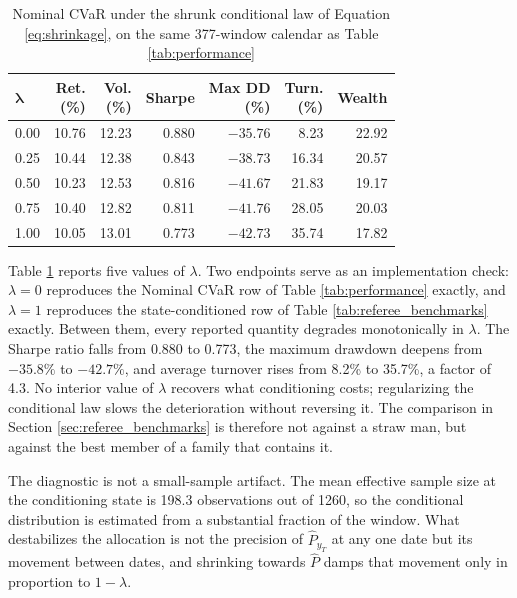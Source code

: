 \documentclass[smallcondensed]{svjour3}
\begin{document}
\begin{table}[!htbp]
\centering
\caption{Nominal CVaR under the shrunk conditional law of Equation \eqref{eq:shrinkage}, on the same 377-window calendar as Table \ref{tab:performance}}
\label{tab:shrinkage}
\small
\begin{tabular}{lrrrrrr}
\toprule
$\boldsymbol{\lambda}$ & \makecell[r]{\textbf{Ret.}\\\textbf{(\%)}} & \makecell[r]{\textbf{Vol.}\\\textbf{(\%)}} & \textbf{Sharpe} & \makecell[r]{\textbf{Max DD}\\\textbf{(\%)}} & \makecell[r]{\textbf{Turn.}\\\textbf{(\%)}} & \textbf{Wealth} \\
\midrule
0.00 & 10.76 & 12.23 & 0.880 & $-35.76$ & 8.23 & 22.92 \\
0.25 & 10.44 & 12.38 & 0.843 & $-38.73$ & 16.34 & 20.57 \\
0.50 & 10.23 & 12.53 & 0.816 & $-41.67$ & 21.83 & 19.17 \\
0.75 & 10.40 & 12.82 & 0.811 & $-41.76$ & 28.05 & 20.03 \\
1.00 & 10.05 & 13.01 & 0.773 & $-42.73$ & 35.74 & 17.82 \\
\bottomrule
\end{tabular}
\end{table}

Table \ref{tab:shrinkage} reports five values of $\lambda$. Two endpoints serve as an implementation check: $\lambda = 0$ reproduces the Nominal CVaR row of Table \ref{tab:performance} exactly, and $\lambda = 1$ reproduces the state-conditioned row of Table \ref{tab:referee_benchmarks} exactly. Between them, every reported quantity degrades monotonically in $\lambda$. The Sharpe ratio falls from 0.880 to 0.773, the maximum drawdown deepens from $-35.8\%$ to $-42.7\%$, and average turnover rises from 8.2\% to 35.7\%, a factor of 4.3. No interior value of $\lambda$ recovers what conditioning costs; regularizing the conditional law slows the deterioration without reversing it. The comparison in Section \ref{sec:referee_benchmarks} is therefore not against a straw man, but against the best member of a family that contains it.

The diagnostic is not a small-sample artifact. The mean effective sample size at the conditioning state is 198.3 observations out of 1260, so the conditional distribution is estimated from a substantial fraction of the window. What destabilizes the allocation is not the precision of $\hat{P}_{y_T}$ at any one date but its movement between dates, and shrinking towards $\hat{P}$ damps that movement only in proportion to $1-\lambda$.
\end{document}
